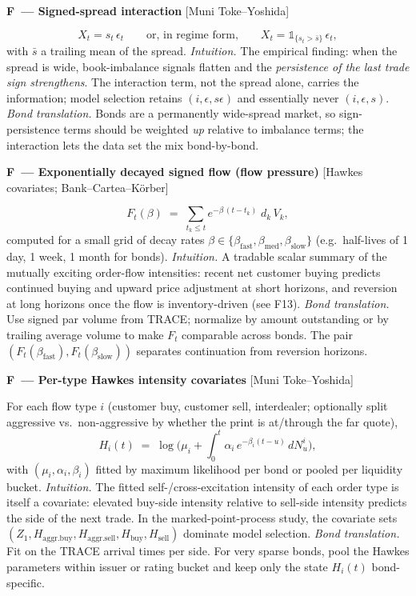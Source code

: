 \documentclass[11pt]{article}
\newcommand{\ind}[1]{\mathbb{1}_{\{#1\}}}
\newcounter{fac}
\newcommand{\factor}[2]{%
  \refstepcounter{fac}%
  \par\medskip\noindent\textbf{F\thefac\ --- #1} \hfill {\small[#2]}\par\nopagebreak}
\begin{document}
\factor{Signed-spread interaction}{Muni Toke--Yoshida}
\[
X_t = s_t \,\epsilon_t
\qquad\text{or, in regime form,}\qquad
X_t = \ind{s_t > \bar s}\,\epsilon_t ,
\]
with $\bar s$ a trailing mean of the spread.
\emph{Intuition.} The empirical finding: when the spread is wide, book-imbalance signals flatten and the \emph{persistence of the last trade sign strengthens}. The interaction term, not the spread alone, carries the information; model selection retains $(i, \epsilon, s\epsilon)$ and essentially never $(i,\epsilon,s)$.
\emph{Bond translation.} Bonds are a permanently wide-spread market, so sign-persistence terms should be weighted \emph{up} relative to imbalance terms; the interaction lets the data set the mix bond-by-bond.

\factor{Exponentially decayed signed flow (flow pressure)}{Hawkes covariates; Bank--Cartea--K\"orber}
\[
F_t(\beta) \;=\; \sum_{t_k \le t} e^{-\beta\,(t - t_k)}\; d_k\, V_k ,
\]
computed for a small grid of decay rates $\beta \in \{\beta_{\text{fast}}, \beta_{\text{med}}, \beta_{\text{slow}}\}$ (e.g.\ half-lives of 1 day, 1 week, 1 month for bonds).
\emph{Intuition.} A tradable scalar summary of the mutually exciting order-flow intensities: recent net customer buying predicts continued buying and upward price adjustment at short horizons, and reversion at long horizons once the flow is inventory-driven (see F13).
\emph{Bond translation.} Use signed par volume from TRACE; normalize by amount outstanding or by trailing average volume to make $F_t$ comparable across bonds. The pair $(F_t(\beta_{\text{fast}}), F_t(\beta_{\text{slow}}))$ separates continuation from reversion horizons.

\factor{Per-type Hawkes intensity covariates}{Muni Toke--Yoshida}
For each flow type $i$ (customer buy, customer sell, interdealer; optionally split aggressive vs.\ non-aggressive by whether the print is at/through the far quote),
\[
H_i(t) \;=\; \log\!\Big( \mu_i + \textstyle\int_0^t \alpha_i\, e^{-\beta_i (t-u)}\, dN^i_u \Big),
\]
with $(\mu_i,\alpha_i,\beta_i)$ fitted by maximum likelihood per bond or pooled per liquidity bucket.
\emph{Intuition.} The fitted self-/cross-excitation intensity of each order type is itself a covariate: elevated buy-side intensity relative to sell-side intensity predicts the side of the next trade. In the marked-point-process study, the covariate sets $(Z_1, H_{\text{aggr.buy}}, H_{\text{aggr.sell}}, H_{\text{buy}}, H_{\text{sell}})$ dominate model selection.
\emph{Bond translation.} Fit on the TRACE arrival times per side. For very sparse bonds, pool the Hawkes parameters within issuer or rating bucket and keep only the state $H_i(t)$ bond-specific.
\end{document}
